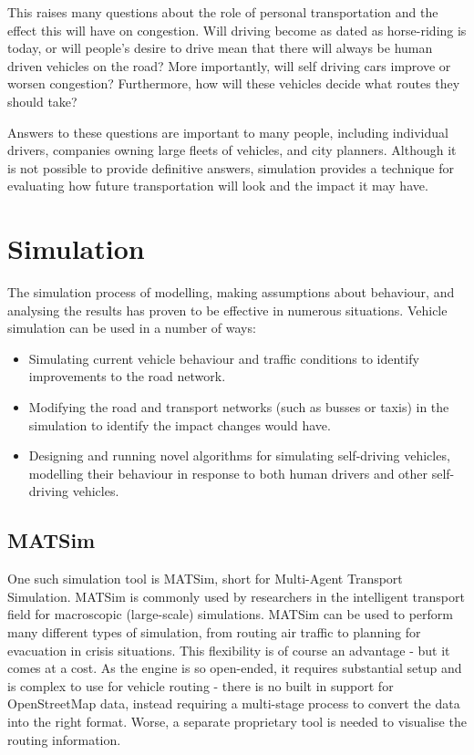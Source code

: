 \documentclass[ %
                    author={Alexander Hill},
                supervisor={Dr. Benjamin Sach},
                    degree={MEng},
                     title={MARMOSET},
                  subtitle={Multi-Agent Route Management using Online Simulation for Efficient Transportation},
                      type={research},
                      year={2016} ]{dissertation}
\begin{document}
This raises many questions about the role of personal transportation and the
effect this will have on congestion. Will driving become as dated as
horse-riding is today, or will people's desire to drive mean that there will
always be human driven vehicles on the road? More importantly, will self driving
cars improve or worsen congestion? Furthermore, how will these vehicles decide
what routes they should take?

Answers to these questions are important to many people, including individual
drivers, companies owning large fleets of vehicles, and city planners. Although
it is not possible to provide definitive answers, simulation provides a
technique for evaluating how future transportation will look and the impact it
may have.

\section{Simulation}

The simulation process of modelling, making assumptions about behaviour, and
analysing the results has proven to be effective in numerous situations.
Vehicle simulation can be used in a number of ways:

\begin{itemize}
    \item Simulating current vehicle behaviour and traffic conditions to
        identify improvements to the road network.
    \item Modifying the road and transport networks (such as busses or taxis) in
        the simulation to identify the impact changes would have.
    \item Designing and running novel algorithms for simulating self-driving
        vehicles, modelling their behaviour in response to both human drivers
        and other self-driving vehicles.
\end{itemize}

\subsection{MATSim}

One such simulation tool is MATSim, short for Multi-Agent Transport Simulation.
MATSim is commonly used by researchers in the intelligent transport field for
macroscopic (large-scale) simulations. MATSim can be used to perform many
different types of simulation, from routing air traffic to planning for
evacuation in crisis situations. This flexibility is of course an advantage -
but it comes at a cost. As the engine is so open-ended, it requires substantial
setup and is complex to use for vehicle routing - there is no built in support
for OpenStreetMap data, instead requiring a multi-stage process to convert the
data into the right format. Worse, a separate proprietary tool is needed to
visualise the routing information.
\end{document}

